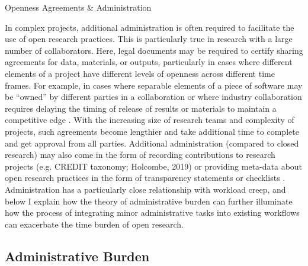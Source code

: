 \documentclass[meta, authordate]{jote-new-article}
\begin{document}
Openness Agreements & Administration\textbf{ }



In complex projects, additional administration is often required to facilitate the use of open research practices. This is particularly true in research with a large number of collaborators. Here, legal documents may be required to certify sharing agreements for data, materials, or outputs, particularly in cases where different elements of a project have different levels of openness across different time frames. For example, in cases where separable elements of a piece of software may be “owned” by different parties in a collaboration \parencites{Levin2017} or where industry collaboration requires delaying the timing of release of results or materials to maintain a competitive edge \parencites{Fernández Pinto2020}. With the increasing size of research teams and complexity of projects, such agreements become lengthier and take additional time to complete and get approval from all parties. Additional administration (compared to closed research) may also come in the form of recording contributions to research projects (e.g. CREDIT taxonomy; Holcombe, 2019) or providing meta-data about open research practices in the form of transparency statements or checklists \parencites{Aczel2020}. Administration has a particularly close relationship with workload creep, and below I explain how the theory of administrative burden can further illuminate how the process of integrating minor administrative tasks into existing workflows can exacerbate the time burden of open research.



\subsection{Administrative Burden}
\end{document}
